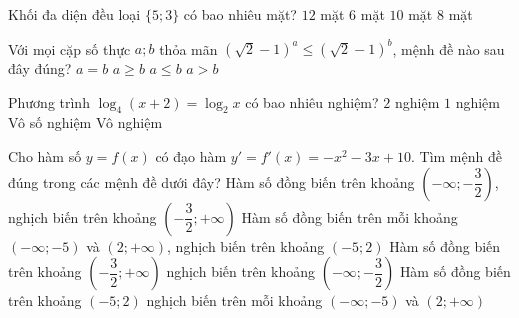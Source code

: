 \begin{ex}%
 Khối đa diện đều loại $\lbrace 5;3 \rbrace$ có bao nhiêu mặt?
\choice
{\True $12$ mặt}
{$6$ mặt}
{$10$ mặt}
{$8$ mặt}
\end{ex}

\begin{ex}%
Với mọi cặp số thực $a;b$ thỏa mãn $\left( \sqrt{2} -1 \right)^{a} \le \left( \sqrt{2}-1 \right)^b$, mệnh đề nào sau đây đúng?
\choice
{$a=b$}
{\True $a\geq b$}
{$a\le b$}
{$a>b$}
\end{ex}

\begin{ex}%
Phương trình $\log_4(x+2)=\log_2x$ có bao nhiêu nghiệm?
\choice
{$2$ nghiệm}
{\True $1$ nghiệm}
{Vô số nghiệm}
{Vô nghiệm}
\end{ex}

\begin{ex}%
Cho hàm số $y=f(x)$ có đạo hàm $y'=f'(x)=-x^2-3x+10$. Tìm mệnh đề đúng trong các mệnh đề dưới đây?
\choice
{Hàm số đồng biến trên khoảng $\left( - \infty; -\dfrac{3}{2} \right)$, nghịch biến trên khoảng $\left( - \dfrac{3}{2}; + \infty \right)$}
{Hàm số đồng biến trên mỗi khoảng $\left(-\infty;-5 \right)$ và $(2;+\infty )$, nghịch biến trên khoảng $(-5;2)$}
{Hàm số đồng biến trên khoảng $\left( - \dfrac{3}{2};+\infty \right)$ nghịch biến trên khoảng $\left( - \infty; - \dfrac{3}{2}\right)$}
{\True Hàm số đồng biến trên khoảng $(-5;2)$ nghịch biến trên mỗi khoảng $(-\infty;-5)$ và $(2;+\infty )$}
\end{ex}

